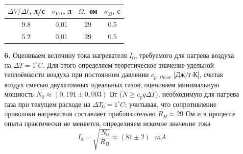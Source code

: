 \documentclass[a4paper, 12pt]{article}%
\begin{document}
\begin{enumerate}
\begin{center}
\begin{tabular}{|c|c|c|c|}
\hline
$\Delta V/ \Delta t$, л/с & $\sigma_{V/t}$, л & $\Omega,$ ом & $\sigma_\Omega$, c \\ \hline
9.8             & 0,01           & 29       & 0.5                   \\ \hline
5.2             & 0,01           & 29         & 0.5                  \\ \hline
\end{tabular}

\end{center}
\item [\textbf{6.}] Оцениваем величину тока нагревателя $I_0$, требуемого для нагрева воздуха на $\Delta T = 1 ^{\circ}C$. Для этого определяем теоретическое значение удельной теплоёмкости воздуха при постоянном давлении $c_{p \text{ } theor}$ [Дж/г$\cdot$К], считая воздух смесью двухатомных идеальных газов; оцениваем минимальную мощность $N_0 \approx (0,191 \pm 0,003)$ Вт ($N \geq c_p q \Delta T$), необходимую для нагрева газа при текущем расходе на $\Delta T_0 = 1^{\circ}C$; учитывая, что сопротивление проволоки нагревателя составляет приблизительно $R_H \approx 29$ Ом и в процессе опыта практически не меняется, определияем искомое значение тока $$I_0 = \sqrt{\dfrac{N_0}{R_H}} \approx (81 \pm 2) \text{ } mA$$  
\end{enumerate}
\end{document}

